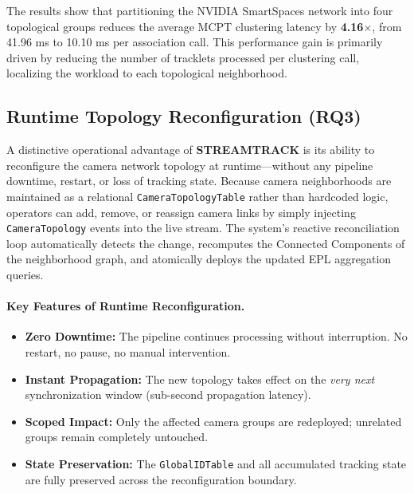 \documentclass[11pt]{article}
\begin{document}
\begin{table}[H]
    \centering
    \caption{Impact of Topological Optimization: Global vs. Topology-Aware (NVIDIA SmartSpaces).}
    \label{tab:9camera_performance}
\end{table}

The results show that partitioning the NVIDIA SmartSpaces network into four topological groups reduces the average MCPT clustering latency by \textbf{4.16$\times$}, from 41.96 ms to 10.10 ms per association call. This performance gain is primarily driven by reducing the number of tracklets processed per clustering call, localizing the workload to each topological neighborhood.

\subsection{Runtime Topology Reconfiguration (RQ3)}

A distinctive operational advantage of \textbf{STREAMTRACK} is its ability to reconfigure the camera network topology at runtime---without any pipeline downtime, restart, or loss of tracking state. Because camera neighborhoods are maintained as a relational \texttt{CameraTopologyTable} rather than hardcoded logic, operators can add, remove, or reassign camera links by simply injecting \texttt{CameraTopology} events into the live stream. The system's reactive reconciliation loop automatically detects the change, recomputes the Connected Components of the neighborhood graph, and atomically deploys the updated EPL aggregation queries.

\paragraph{Key Features of Runtime Reconfiguration.}
\begin{itemize}[leftmargin=*]
    \item \textbf{Zero Downtime:} The pipeline continues processing without interruption. No restart, no pause, no manual intervention.
    \item \textbf{Instant Propagation:} The new topology takes effect on the \emph{very next} synchronization window (sub-second propagation latency).
    \item \textbf{Scoped Impact:} Only the affected camera groups are redeployed; unrelated groups remain completely untouched.
    \item \textbf{State Preservation:} The \texttt{GlobalIDTable} and all accumulated tracking state are fully preserved across the reconfiguration boundary.
\end{itemize}
\end{document}

